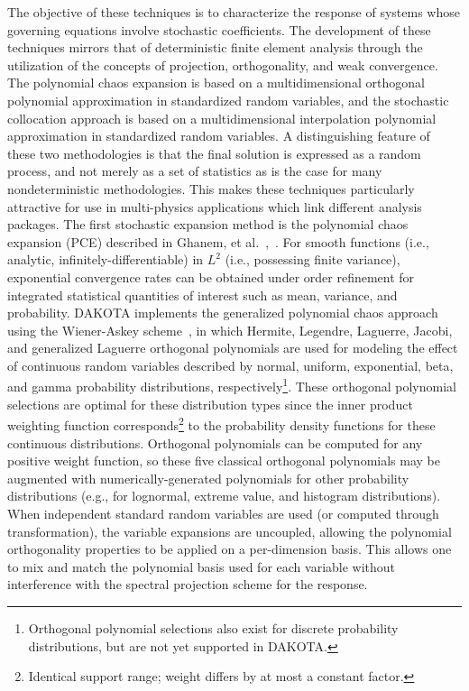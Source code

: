 The objective of these techniques is to characterize the response of
systems whose governing equations involve stochastic coefficients. The
development of these techniques mirrors that of deterministic finite
element analysis through the utilization of the concepts of
projection, orthogonality, and weak convergence. The polynomial chaos
expansion is based on a multidimensional orthogonal polynomial
approximation in standardized random variables, and the stochastic
collocation approach is based on a multidimensional interpolation
polynomial approximation in standardized random variables.  A
distinguishing feature of these two methodologies is that the final
solution is expressed as a random process, and not merely as a set of
statistics as is the case for many nondeterministic methodologies.
This makes these techniques particularly attractive for use in
multi-physics applications which link different analysis packages.
The first stochastic expansion method is the polynomial chaos
expansion (PCE) described in Ghanem, et
al.~\cite{Gha99},~\cite{Gha91}.  For smooth functions (i.e., analytic,
infinitely-differentiable) in $L^2$ (i.e., possessing finite
variance), exponential convergence rates can be obtained under order
refinement for integrated statistical quantities of interest such as
mean, variance, and probability.  DAKOTA implements the generalized
polynomial chaos approach using the Wiener-Askey
scheme~\cite{XiuKarn02}, in which Hermite, Legendre, Laguerre, Jacobi,
and generalized Laguerre orthogonal polynomials are used for modeling
the effect of continuous random variables described by normal,
uniform, exponential, beta, and gamma probability distributions,
respectively\footnote{Orthogonal polynomial selections also exist for
discrete probability distributions, but are not yet supported in
DAKOTA.}.  These orthogonal polynomial selections are optimal for
these distribution types since the inner product weighting function
corresponds\footnote{Identical support range; weight
differs by at most a constant factor.} to the probability
density functions for these continuous distributions.  Orthogonal polynomials
can be computed for any positive weight function, so these five
classical orthogonal polynomials may be augmented with
numerically-generated polynomials for other probability distributions
(e.g., for lognormal, extreme value, and histogram distributions).
When independent standard random variables are used (or computed
through transformation), the variable expansions are uncoupled,
allowing the polynomial orthogonality properties to be applied on a
per-dimension basis.  This allows one to mix and match the polynomial
basis used for each variable without interference with the spectral
projection scheme for the response.  

